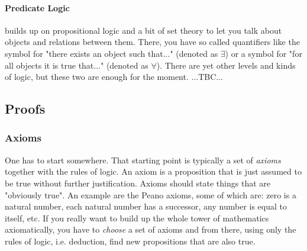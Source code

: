 


\paragraph{Predicate Logic} builds up on propositional logic and a bit of set theory to let you talk about objects and relations between them. There, you have so called quantifiers like the symbol for "there exists an object such that..." (denoted as $\exists$) or a symbol for "for all objects it is true that..." (denoted as $\forall$). There are yet other levels and kinds of logic, but these two are enough for the moment. ...TBC...

\subsection{Proofs} %

\subsubsection{Axioms}
One has to start somewhere. That starting point is typically a set of \emph{axioms} together with the rules of logic. An axiom is a proposition that is just assumed to be true without further justification. Axioms should state things that are "obviously true". An example are the Peano axioms, some of which are: zero is a natural number, each natural number has a successor, any number is equal to itself, etc. If you really want to build up the whole tower of mathematics axiomatically, you have to \emph{choose} a set of axioms and from there, using only the rules of logic, i.e. deduction, find new propositions that are also true.

